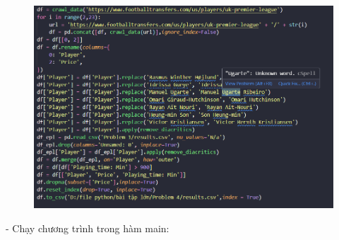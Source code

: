 \documentclass[12pt, letterpaper]{article}
\begin{document}
\begin{figure}[H]
    \centering
    \includegraphics[width=1\linewidth]{img/4-1_3.png}
\end{figure}
- Chạy chương trình trong hàm main:
\end{document}
